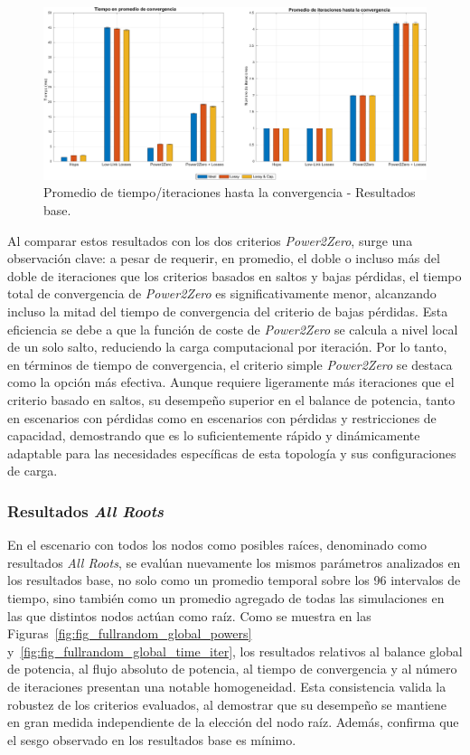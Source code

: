 \begin{figure}[ht!]
    \centering
    \includegraphics[width=\textwidth]{fig/07_bloste/bloste_11.pdf}
    \caption{Promedio de tiempo/iteraciones hasta la convergencia - Resultados base.}
    \label{fig:fig_base_global_time_iter}
\end{figure}


Al comparar estos resultados con los dos criterios \textit{Power2Zero}, surge una observación clave: a pesar de requerir, en promedio, el doble o incluso más del doble de iteraciones que los criterios basados en saltos y bajas pérdidas, el tiempo total de convergencia de \textit{Power2Zero} es significativamente menor, alcanzando incluso la mitad del tiempo de convergencia del criterio de bajas pérdidas. Esta eficiencia se debe a que la función de coste de \textit{Power2Zero} se calcula a nivel local de un solo salto, reduciendo la carga computacional por iteración. Por lo tanto, en términos de tiempo de convergencia, el criterio simple \textit{Power2Zero} se destaca como la opción más efectiva. Aunque requiere ligeramente más iteraciones que el criterio basado en saltos, su desempeño superior en el balance de potencia, tanto en escenarios con pérdidas como en escenarios con pérdidas y restricciones de capacidad, demostrando que es lo suficientemente rápido y dinámicamente adaptable para las necesidades específicas de esta topología y sus configuraciones de carga.


\subsubsection{Resultados \textit{All Roots}}

En el escenario con todos los nodos como posibles raíces, denominado como resultados \textit{All Roots}, se evalúan nuevamente los mismos parámetros analizados en los resultados base, no solo como un promedio temporal sobre los 96 intervalos de tiempo, sino también como un promedio agregado de todas las simulaciones en las que distintos nodos actúan como raíz. Como se muestra en las Figuras~\ref{fig:fig_fullrandom_global_powers} y~\ref{fig:fig_fullrandom_global_time_iter}, los resultados relativos al balance global de potencia, al flujo absoluto de potencia, al tiempo de convergencia y al número de iteraciones presentan una notable homogeneidad. Esta consistencia valida la robustez de los criterios evaluados, al demostrar que su desempeño se mantiene en gran medida independiente de la elección del nodo raíz. Además, confirma que el sesgo observado en los resultados base es mínimo.


